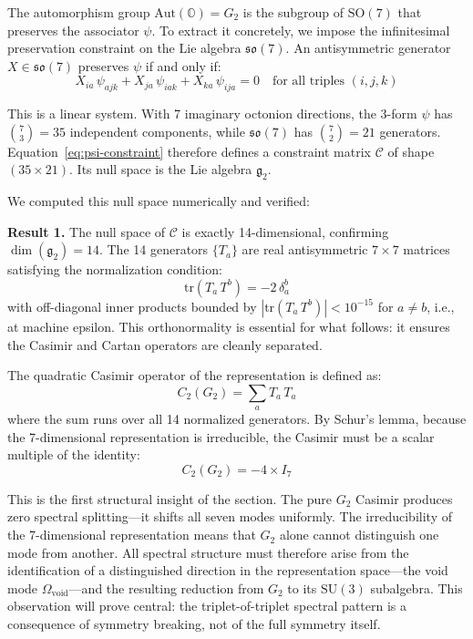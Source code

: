 \documentclass[12pt,a4paper]{article}
\begin{document}
The automorphism group $\mathrm{Aut}(\mathbb{O}) = G_2$ is the subgroup of $\mathrm{SO}(7)$ that preserves the associator $\psi$. To extract it concretely, we impose the infinitesimal preservation constraint on the Lie algebra $\mathfrak{so}(7)$. An antisymmetric generator $X \in \mathfrak{so}(7)$ preserves $\psi$ if and only if:
\begin{equation}
X_{ia}\,\psi_{ajk} + X_{ja}\,\psi_{iak} + X_{ka}\,\psi_{ija} = 0 \quad \text{for all triples } (i, j, k)
\label{eq:psi-constraint}
\end{equation}

This is a linear system. With 7 imaginary octonion directions, the 3-form $\psi$ has $\binom{7}{3} = 35$ independent components, while $\mathfrak{so}(7)$ has $\binom{7}{2} = 21$ generators. Equation~\eqref{eq:psi-constraint} therefore defines a constraint matrix $\mathcal{C}$ of shape $(35 \times 21)$. Its null space is the Lie algebra $\mathfrak{g}_2$.

We computed this null space numerically and verified:

\textbf{Result 1.} The null space of $\mathcal{C}$ is exactly 14-dimensional, confirming $\dim(\mathfrak{g}_2) = 14$. The 14 generators $\{T_a\}$ are real antisymmetric $7 \times 7$ matrices satisfying the normalization condition:
\begin{equation}
\mathrm{tr}(T_a\,T^b) = -2\,\delta_a^b
\label{eq:normalization}
\end{equation}
with off-diagonal inner products bounded by $|\mathrm{tr}(T_a\,T^b)| < 10^{-15}$ for $a \neq b$, i.e., at machine epsilon. This orthonormality is essential for what follows: it ensures the Casimir and Cartan operators are cleanly separated.

The quadratic Casimir operator of the representation is defined as:
\begin{equation}
C_2(G_2) = \sum_a T_a\,T_a
\label{eq:casimir-def}
\end{equation}
where the sum runs over all 14 normalized generators. By Schur's lemma, because the 7-dimensional representation is irreducible, the Casimir must be a scalar multiple of the identity:
\begin{equation}
C_2(G_2) = -4 \times I_7
\label{eq:casimir-value}
\end{equation}

This is the first structural insight of the section. The pure $G_2$ Casimir produces zero spectral splitting---it shifts all seven modes uniformly. The irreducibility of the 7-dimensional representation means that $G_2$ alone cannot distinguish one mode from another. All spectral structure must therefore arise from the identification of a distinguished direction in the representation space---the void mode $\Omega_{\mathrm{void}}$---and the resulting reduction from $G_2$ to its $\mathrm{SU}(3)$ subalgebra. This observation will prove central: the triplet-of-triplet spectral pattern is a consequence of symmetry breaking, not of the full symmetry itself.
\end{document}
